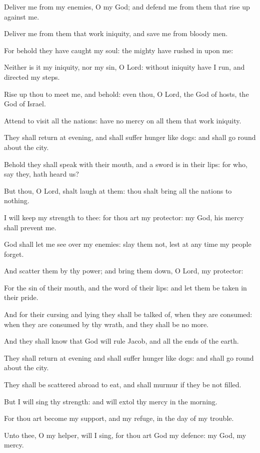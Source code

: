 ﻿\item Deliver me from my enemies, O my God; and defend me from them that rise up against me.
\item Deliver me from them that work iniquity, and save me from bloody men.
\item For behold they have caught my soul: the mighty have rushed in upon me:
\item Neither is it my iniquity, nor my sin, O Lord: without iniquity have I run, and directed my steps.
\item Rise up thou to meet me, and behold: even thou, O Lord, the God of hosts, the God of Israel.
\item Attend to visit all the nations: have no mercy on all them that work iniquity.
\item They shall return at evening, and shall suffer hunger like dogs: and shall go round about the city.
\item Behold they shall speak with their mouth, and a sword is in their lips: for who, say they, hath heard us?
\item But thou, O Lord, shalt laugh at them: thou shalt bring all the nations to nothing.
\item I will keep my strength to thee: for thou art my protector: my God, his mercy shall prevent me.
\item God shall let me see over my enemies: slay them not, lest at any time my people forget. 
\item And scatter them by thy power; and bring them down, O Lord, my protector:
\item For the sin of their mouth, and the word of their lips: and let them be taken in their pride.
\item And for their cursing and lying they shall be talked of, when they are consumed: when they are consumed by thy wrath, and they shall be no more.
\item And they shall know that God will rule Jacob, and all the ends of the earth.
\item They shall return at evening and shall suffer hunger like dogs: and shall go round about the city.
\item They shall be scattered abroad to eat, and shall murmur if they be not filled.
\item But I will sing thy strength: and will extol thy mercy in the morning.\ifx\enlinebreakaftereighteen\undefined\else\\\fi
\item For thou art become my support, and my refuge, in the day of my trouble.
\item Unto thee, O my helper, will I sing, for thou art God my defence: my God, my mercy.
